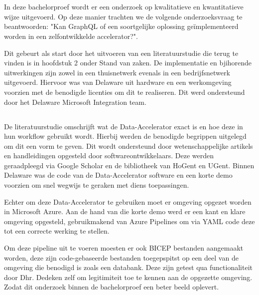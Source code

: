 
\chapter{}%
\label{ch:methodologie}

In deze bachelorproef wordt er een onderzoek op kwalitatieve en kwantitatieve wijze uitgevoerd. Op deze manier trachten we de volgende onderzoeksvraag te beantwoorden: "Kan GraphQL of een soortgelijke oplossing geïmplementeerd worden in een zelfontwikkelde accelerator?".

Dit gebeurt als start door het uitvoeren van een literatuurstudie die terug te vinden is in hoofdstuk 2 onder Stand van zaken. De implementatie en bjihorende uitwerkingen zijn zowel in een thuisnetwerk evenals in een bedrijfsnetwerk uitgevoerd. Hiervoor was van Delaware uit hardware en een werkomgeving voorzien met de benodigde licenties om dit te realiseren. Dit werd ondersteund door het Delaware Microsoft Integration team.

\section{}%
\label{sec:Testomgeving}

De literatuurstudie omschrijft wat de Data-Accelerator exact is en hoe deze in hun workflow gebruikt wordt. Hierbij werden de benodigde begrippen uitgelegd om dit een vorm te geven. Dit wordt ondersteund door wetenschappelijke artikels en handleidingen opgesteld door softwareontwikkelaars. Deze werden geraadpleegd via Google Scholar en de bibliotheek van HoGent en UGent. Binnen Delaware was de code van de Data-Accelerator software en een korte demo voorzien om snel wegwijs te geraken met diens toepassingen.

Echter om deze Data-Accelerator te gebruiken moet er omgeving opgezet worden in Microsoft Azure. Aan de hand van die korte demo werd er een kant en klare omgeving opgesteld, gebruikmakend van Azure Pipelines om via YAML code deze tot een correcte werking te stellen.

Om deze pipeline uit te voeren moesten er ook BICEP bestanden aangemaakt worden, deze zijn code-gebaseerde bestanden toegepspitst op een deel van de omgeving die benodigd is zoals een databank. Deze zijn getest qua functionaliteit door Dhr. Dedeken zelf om legitimiteit toe te kennen aan de opgezette omgeving. Zodat dit onderzoek binnen de bachelorproef een beter beeld oplevert.

